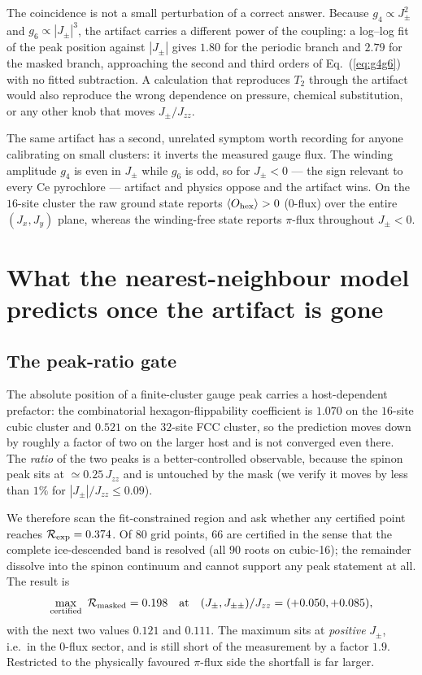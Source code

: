 \documentclass[aps,prb,preprint,amsmath,amssymb,superscriptaddress,
longbibliography,floatfix]{revtex4-2}
\newcommand{\Jzz}{J_{zz}}
\newcommand{\Jpm}{J_{\pm}}
\newcommand{\Jpmpm}{J_{\pm\pm}}
\begin{document}
The coincidence is not a small perturbation of a correct answer.  Because
$g_4\propto\Jpm^2$ and $g_6\propto|\Jpm|^3$, the artifact carries a different
power of the coupling: a log--log fit of the peak position against $|\Jpm|$
gives $1.80$ for the periodic branch and $2.79$ for the masked branch,
approaching the second and third orders of Eq.~(\ref{eq:g4g6}) with no fitted
subtraction.  A calculation that reproduces $T_2$ through the artifact would
also reproduce the wrong dependence on pressure, chemical substitution, or any
other knob that moves $\Jpm/\Jzz$.

The same artifact has a second, unrelated symptom worth recording for anyone
calibrating on small clusters: it inverts the measured gauge flux.  The winding
amplitude $g_4$ is even in $\Jpm$ while $g_6$ is odd, so for $\Jpm<0$ --- the
sign relevant to every Ce pyrochlore --- artifact and physics oppose and the
artifact wins.  On the $16$-site cluster the raw ground state reports
$\langle O_{\rm hex}\rangle>0$ ($0$-flux) over the entire $(J_x,J_y)$ plane,
whereas the winding-free state reports $\pi$-flux throughout $\Jpm<0$.

\section{What the nearest-neighbour model predicts once the artifact is gone}
\label{sec:masked}

\subsection{The peak-ratio gate}

The absolute position of a finite-cluster gauge peak carries a host-dependent
prefactor: the combinatorial hexagon-flippability coefficient is $1.070$ on the
$16$-site cubic cluster and $0.521$ on the $32$-site FCC cluster, so the
prediction moves down by roughly a factor of two on the larger host and is not
converged even there.  The \emph{ratio} of the two peaks is a better-controlled
observable, because the spinon peak sits at $\simeq0.25\,\Jzz$ and is untouched
by the mask (we verify it moves by less than $1\%$ for $|\Jpm|/\Jzz\le0.09$).

We therefore scan the fit-constrained region and ask whether any certified point
reaches $\mathcal R_{\rm exp}=0.374$.  Of $80$ grid points, $66$ are certified
in the sense that the complete ice-descended band is resolved (all $90$ roots on
cubic-16); the remainder dissolve into the spinon continuum and cannot support
any peak statement at all.  The result is
\begin{equation}
 \max_{\rm certified}\ \mathcal R_{\rm masked}=0.198
 \quad\text{at}\quad (\Jpm,\Jpmpm)/\Jzz=(+0.050,+0.085),
 \label{eq:maxratio}
\end{equation}
with the next two values $0.121$ and $0.111$.  The maximum sits at
\emph{positive} $\Jpm$, i.e.\ in the $0$-flux sector, and is still short of the
measurement by a factor $1.9$.  Restricted to the physically favoured
$\pi$-flux side the shortfall is far larger.
\end{document}
